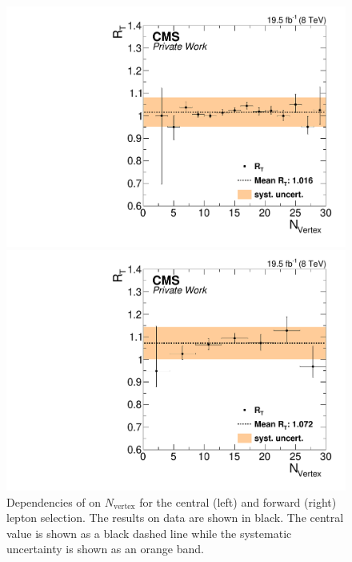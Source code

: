 \begin{figure}[htbp]
\centering
\begin{minipage}[t]{0.49\textwidth}
  \includegraphics[width=\textwidth]{plots/BG/trigger/Triggereff_SFvsOF_Syst_AlphaT_HighHTExclusiveCentral_Full2012_nVtx_None.pdf}
\end{minipage}
\begin{minipage}[t]{0.49\textwidth}
\includegraphics[width=\textwidth]{plots/BG/trigger/Triggereff_SFvsOF_Syst_AlphaT_HighHTExclusiveForward_Full2012_nVtx_None.pdf}
\end{minipage}
\caption{Dependencies of \RT on $N_{\text{vertex}}$ for the central (left) and forward (right) lepton selection. The results on data are shown in black. The central value is shown as a black dashed line while the systematic uncertainty is shown as an orange band.}
\label{fig:RTDependenciesApp3}
\end{figure}  
